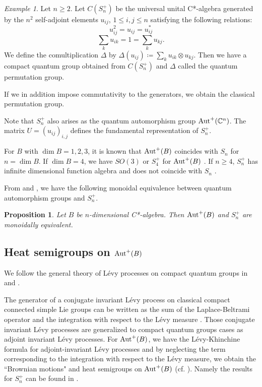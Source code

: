 \documentclass[12pt]{amsart}
\theoremstyle{plain} %
\newtheorem{proposition}[equation]{Proposition}
\theoremstyle{definition}
\theoremstyle{remark}
\newtheorem{example}[equation]{Example}
\begin{document}
\begin{example}
Let $n\geq2$. Let $C(S_n^+)$ be the universal unital C*-algebra generated by the $n^2$ self-adjoint elements $u_{ij}$, $1\leq i, j\leq n$ satisfying the following relations:
\[u_{ij}^2=u_{ij}=u_{ij}^*\]
\[\sum_k u_{ik}=1=\sum_k u_{kj}.\]
We define the comultiplication $\Delta$ by $\Delta(u_{ij})\coloneqq\sum_k u_{ik}\otimes u_{kj}$. Then we have a compact quantum group obtained from $C(S_n^+)$ and $\Delta$ called the quantum permutation group. 

If we in addition impose commutativity to the generators, we obtain the classical permutation group. 

Note that $S_n^+$ also arises as the quantum automorphism group ${\rm Aut}^+(\mathbb{C}^n)$. The matrix $U=(u_{ij})_{i, j}$ defines the fundamental representation of $S_n^+$.
\end{example}

For $B$ with $\dim B=1, 2, 3$, it is known that ${\rm Aut}^+(B)$ coincides with $S_n$ for $n=\dim B$. If $\dim B=4$, we have $SO(3)$ or $S_4^+$ for ${\rm Aut}^+(B)$ \cite[Section 3]{Wan98}. If $n\geq 4$, $S_n^+$ has infinite dimensional function algebra and does not coincide with $S_n$ \cite[Proposition 6.2]{Wan99}. 

From \cite[Proposition 19]{DCFY} and \cite[Theorem 4.2]{DVV}, we have the following monoidal equivalence between quantum automorphism groups and $S_n^+$.

\begin{proposition}
Let $B$ be $n$-dimensional C*-algebra.
Then ${\rm Aut}^+(B)$ and $S_n^+$ are monoidally equivalent.
\end{proposition}


\subsection{Heat semigroups on ${\rm Aut}^+(B)$}

We follow the general theory of L\'evy processes on compact quantum groups in \cite{Sch93} and \cite{CFK}.

The generator of a conjugate invariant L\'evy process on classical compact connected simple Lie groups can be written as the sum of the Laplace-Beltrami operator and the integration with respect to the L\'evy measure \cite[Proposition 4.4, Proposition 4.5]{Lia04}.
Those conjugate invariant L\'evy processes are generalized to compact quantum groups cases as adjoint invariant L\'evy processes.
For ${\rm Aut}^+(B)$, we have the L\'evy-Khinchine formula for adjoint-invariant L\'evy processes and by neglecting the term corresponding to the integration with respect to the L\'evy measure, we obtain the ``Brownian motions" and heat semigroups on ${\rm Aut}^+(B)$\cite[Theorem 3.14]{BGJ2} (cf. \cite[Section 6]{Cas21}).  Namely the results for $S_n^+$ can be found in \cite{FKS}.
\end{document}
